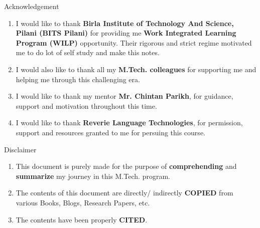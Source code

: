 \thispagestyle{empty}


\begin{center}
    \Huge Acknowledgement
    \vspace{0.5cm}
\end{center}

\begin{enumerate}
    \item I would like to thank \textbf{Birla Institute of Technology And Science, Pilani (BITS Pilani)} for providing me \textbf{Work Integrated Learning Program (WILP)} opportunity. Their rigorous and strict regime motivated me to do lot of self study and make this notes.

    \item I would also like to thank all my \textbf{M.Tech. colleagues} for supporting me and helping me through this challenging era.

    \item I would like to thank my mentor \textbf{Mr. Chintan Parikh}, for guidance, support and motivation throughout this time.

    \item I would like to thank \textbf{Reverie Language Technologies}, for permission, support and resources granted to me for persuing this course.
\end{enumerate}










\vspace{5cm}

\begin{center}
    \Huge Disclaimer
    \vspace{0.5cm}
\end{center}

\begin{enumerate}
    \item This document is purely made for the purpose of \textbf{comprehending} and \textbf{summarize} my journey in this M.Tech. program.

    \item The contents of this document are directly/ indirectly \textbf{COPIED} from various Books, Blogs, Research Papers, etc.

    \item The contents have been properly \textbf{CITED}.
\end{enumerate}


\restoregeometry

